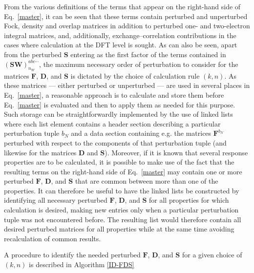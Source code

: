 \documentclass[%
 reprint,
 amsmath,amssymb,
 aps,
]{revtex4-1}
\begin{document}
From the various definitions of the terms that appear on the right-hand side of
Eq.~\eqref{master}, it can be seen that these terms contain perturbed and
unperturbed Fock, density and overlap matrices in addition to perturbed one-
and two-electron integral matrices, and, additionally, exchange--correlation
contributions in the cases where calculation at the DFT level is sought. As can
also be seen, apart from the perturbed $\mathbf{S}$ entering as the first
factor of the terms contained in $(\mathbf{SW})_{n_{W}}^{abc\cdots}$, the
maximum necessary order of perturbation to consider for the matrices
$\mathbf{F}$, $\mathbf{D}$, and $\mathbf{S}$ is dictated by the choice of
calculation rule $(k, n)$. As these matrices --- either perturbed or
unperturbed --- are used in several places in Eq.~\eqref{master}, a reasonable
approach is to calculate and store them before Eq.~\eqref{master} is evaluated
and then to apply them as needed for this purpose. Such storage can be
straightforwardly implemented by the use of linked lists where each list
element contains a header section describing a particular perturbation tuple
$b_{N}$ and a data section containing e.g. the matrices $\mathbf{F}^{b_{N}}$
perturbed with respect to the components of that perturbation tuple (and
likewise for the matrices $\mathbf{D}$ and $\mathbf{S}$). Moreover, if it is
known that several response properties are to be calculated, it is possible to
make use of the fact that the resulting terms on the right-hand side of
Eq.~\eqref{master} may contain one or more perturbed $\mathbf{F}$,
$\mathbf{D}$, and $\mathbf{S}$ that are common between more than one of the
properties. It can therefore be useful to have the linked lists be constructed
by identifying all necessary perturbed $\mathbf{F}$, $\mathbf{D}$, and
$\mathbf{S}$ for all properties for which calculation is desired, making new
entries only when a particular perturbation tuple was not encountered before.
The resulting list would therefore contain all desired perturbed matrices for
all properties while at the same time avoiding recalculation of common results.

A procedure to identify the needed perturbed $\mathbf{F}$, $\mathbf{D}$, and
$\mathbf{S}$ for a given choice of $(k, n)$ is described in Algorithm
\ref{ID-FDS} 
\end{document}
